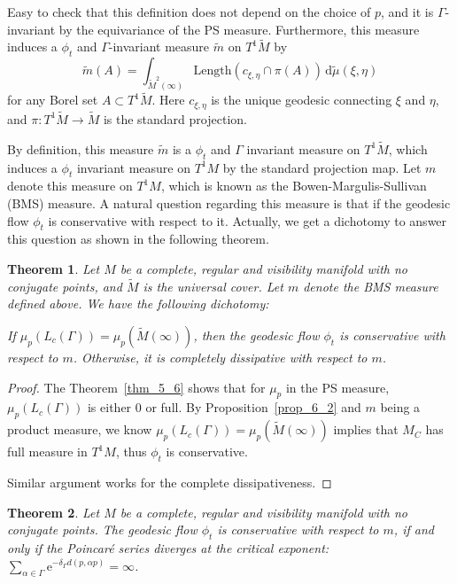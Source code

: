 \documentclass[reqno,11pt]{article}
\newtheorem{theorem}{Theorem}[section]
\theoremstyle{definition}
\theoremstyle{remark}
\numberwithin{equation}{section}
\begin{document}
Easy to check that this definition does not depend on the choice of $p$, and it is $\Gamma$-invariant by the equivariance of the PS measure. Furthermore, this measure induces a $\phi_t$ and $\Gamma$-invariant measure $\widetilde{m}$ on $T^1\widetilde{M}$ by
\begin{displaymath}
    \widetilde{m}(A)=\int_{\widetilde{M}^2(\infty)}\text{Length}(c_{\xi,\eta}\cap \pi(A))\,\mathrm{d}\widetilde{\mu}(\xi,\eta)
\end{displaymath}
for any Borel set $A\subset T^1\widetilde{M}$. Here $c_{\xi,\eta}$ is the unique geodesic connecting $\xi$ and $\eta$, and $\pi:T^1 \widetilde{M}\to\widetilde{M}$ is the standard projection.

By definition, this measure $\widetilde{m}$ is a $\phi_t$ and $\Gamma$ invariant measure on $T^1\widetilde{M}$, which induces a $\phi_t$ invariant measure on $T^1M$ by the standard projection map. Let $m$ denote this measure on $T^1M$, which is known as the Bowen-Margulis-Sullivan (BMS) measure. A natural question regarding this measure is that if the geodesic flow $\phi_t$ is conservative with respect to it. Actually, we get a dichotomy to answer this question as shown in the following theorem.

\begin{theorem}\label{thm_6_3}
	Let $M$ be a complete, regular and visibility manifold with no conjugate points, and $\widetilde{M}$ is the universal cover. Let $m$ denote the BMS measure defined above. We have the following dichotomy:

	If $\mu_p(L_c(\Gamma))=\mu_p(\widetilde{M}(\infty))$, then the geodesic flow $\phi_t$ is conservative with respect to $m$. Otherwise, it is completely dissipative with respect to $m$.
\end{theorem}

\begin{proof}
	The Theorem~\ref{thm_5_6} shows that for $\mu_p$ in the PS measure, $\mu_p(L_c(\Gamma))$ is either $0$ or full. By Proposition~\ref{prop_6_2} and $m$ being a product measure, we know $\mu_p(L_c(\Gamma))=\mu_p(\widetilde{M}(\infty))$ implies that $M_C$ has full measure in $T^1M$, thus $\phi_t$ is conservative.

	Similar argument works for the complete dissipativeness.
\end{proof}

\begin{theorem}\label{thm_6_4}
	Let $M$ be a complete, regular and visibility manifold with no conjugate points. The geodesic flow $\phi_t$ is conservative with respect to $m$, if and only if the Poincar\'e series diverges at the critical exponent: $\sum_{\alpha\in\Gamma}\mathrm{e}^{-\delta_\Gamma d(p,\alpha p)}=\infty$.
\end{theorem}
\end{document}
